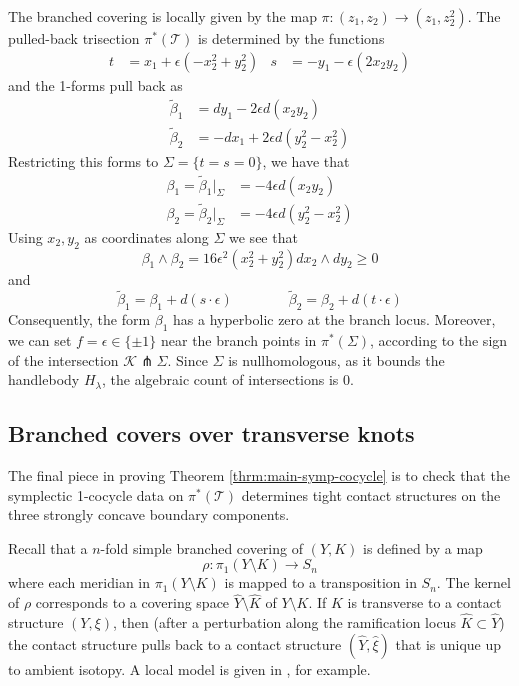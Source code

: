 \documentclass[11pt]{amsart}
\theoremstyle{definition}
\theoremstyle{remark}
\numberwithin{equation}{section}
\newcommand{\betat}{\widetilde{\beta}}
\newcommand{\cT}{\mathcal{T}}
\newcommand{\cK}{\mathcal{K}}
\begin{document}
\begin{enumerate}
The branched covering is locally given by the map $\pi: (z_1,z_2) \rightarrow (z_1,z_2^2)$.  The pulled-back trisection $\pi^*(\cT)$ is determined by the functions
\begin{align*}
t &= x_1 + \epsilon(- x_2^2 + y_2^2) & s &= -y_1 - \epsilon(2x_2 y_2)
\end{align*}
and the 1-forms pull back as
\begin{align*}
    \betat_1 &= dy_1 - 2\epsilon d(x_2y_2)\\
    \betat_2 &= -dx_1 + 2\epsilon d(y_2^2 - x_2^2)
\end{align*}
Restricting this forms to $\Sigma = \{t = s = 0\}$, we have that
\begin{align*}
   \beta_1 = \betat_1|_{\Sigma} &= -4\epsilon d(x_2y_2) \\
   \beta_2 = \betat_2|_{\Sigma} &= -4\epsilon d(y_2^2 - x_2^2)
\end{align*}
Using $x_2,y_2$ as coordinates along $\Sigma$ we see that
\[\beta_1 \wedge \beta_2 = 16\epsilon^2(x_2^2 + y_2^2) dx_2 \wedge dy_2 \geq 0\]
and
\[ \betat_1 = \beta_1 + d(s \cdot \epsilon) \qquad \qquad \betat_2 = \beta_2 + d(t \cdot \epsilon)\]
Consequently, the form $\beta_1$ has a hyperbolic zero at the branch locus. 
 Moreover, we can set $f = \epsilon \in \{\pm 1\}$ near the branch points in $\pi^*(\Sigma)$, according to the sign of the intersection $\cK \pitchfork \Sigma$.  Since $\Sigma$ is nullhomologous, as it bounds the handlebody $H_{\lambda}$, the algebraic count of intersections is 0.
\end{enumerate}




\subsection{Branched covers over transverse knots}

The final piece in proving Theorem \ref{thrm:main-symp-cocycle} is to check that the symplectic 1-cocycle data on $\pi^*(\cT)$ determines tight contact structures on the three strongly concave boundary components.

Recall that a $n$-fold simple branched covering of $(Y,K)$ is defined by a map
\[\rho: \pi_1(Y \setminus K) \rightarrow S_n\]
where each meridian in $\pi_1(Y \setminus K)$ is mapped to a transposition in $S_n$.  The kernel of $\rho$ corresponds to a covering space $\widehat{Y} \setminus \widehat{K}$ of $Y \setminus K$.  If $K$ is transverse to a contact structure $(Y,\xi)$, then (after a perturbation along the ramification locus $\widehat{K} \subset \widehat{Y}$) the contact structure pulls back to a contact structure $(\widehat{Y},\widehat{\xi})$ that is unique up to ambient isotopy.  A local model is given in \cite[Theorem 7.5.4]{Geiges}, for example.  
\end{document}

